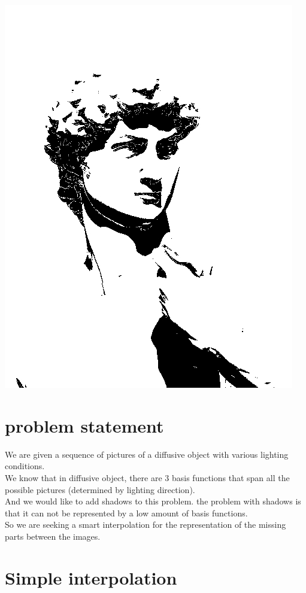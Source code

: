 \documentclass[12pt]{article}
\begin{document}
\includegraphics[scale=0.18]{e.jpg}

\section{problem statement}	
We are given a sequence of pictures of a diffusive object with various lighting conditions. \\
We know that in diffusive object, there are 3 basis functions that span all the possible pictures (determined by lighting direction). \\
And we would like to add shadows to this problem. the problem with shadows is that it can not be represented by a low amount of basis functions. \\
So we are seeking a smart interpolation for the representation of the missing parts between the images.

\newpage

\section{Simple interpolation }
\end{document}
